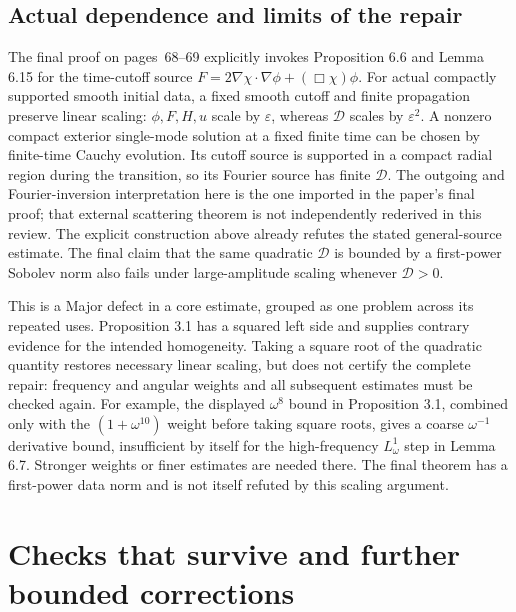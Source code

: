 \documentclass[10pt]{article}
\begin{document}
\subsection*{Actual dependence and limits of the repair}
The final proof on pages 68–69 explicitly invokes Proposition 6.6 and Lemma 6.15 for the time-cutoff source \(F=2\nabla\chi\cdot\nabla\phi+(\Box\chi)\phi\). For actual compactly supported smooth initial data, a fixed smooth cutoff and finite propagation preserve linear scaling: \(\phi,F,H,u\) scale by \(\varepsilon\), whereas \(\mathcal D\) scales by \(\varepsilon^2\). A nonzero compact exterior single-mode solution at a fixed finite time can be chosen by finite-time Cauchy evolution. Its cutoff source is supported in a compact radial region during the transition, so its Fourier source has finite \(\mathcal D\). The outgoing and Fourier-inversion interpretation here is the one imported in the paper’s final proof; that external scattering theorem is not independently rederived in this review. The explicit construction above already refutes the stated general-source estimate. The final claim that the same quadratic \(\mathcal D\) is bounded by a first-power Sobolev norm also fails under large-amplitude scaling whenever \(\mathcal D>0\).\par
This is a Major defect in a core estimate, grouped as one problem across its repeated uses. Proposition 3.1 has a squared left side and supplies contrary evidence for the intended homogeneity. Taking a square root of the quadratic quantity restores necessary linear scaling, but does not certify the complete repair: frequency and angular weights and all subsequent estimates must be checked again. For example, the displayed \(\omega^8\) bound in Proposition 3.1, combined only with the \((1+\omega^{10})\) weight before taking square roots, gives a coarse \(\omega^{-1}\) derivative bound, insufficient by itself for the high-frequency \(L^1_\omega\) step in Lemma 6.7. Stronger weights or finer estimates are needed there. The final theorem has a first-power data norm and is not itself refuted by this scaling argument.\par
\section*{Checks that survive and further bounded corrections}
\end{document}
